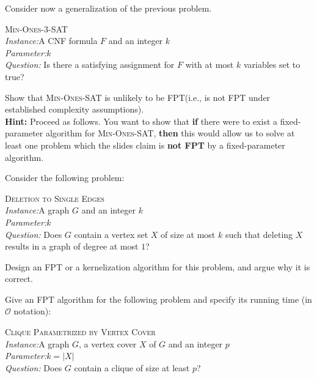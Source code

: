\documentclass{article}
\begin{document}
\begin{exercise}
    Consider now a generalization of the previous problem.
    \begin{mdframed} \textsc{Min-Ones-3-SAT} \\
        \textit{Instance:}A CNF formula $F$ and an integer $k$\\
\textit{Parameter:}$k$\\
\textit{Question:} Is there a satisfying assignment for $F$ with at most $k$ variables set to true?
  \end{mdframed}

  Show that \textsc{Min-Ones-SAT} is unlikely to be FPT(i.e., is not FPT under established complexity assumptions).\\
  \textbf{Hint:} Proceed as follows. You want to show that \textbf{if} there were to exist a fixed-parameter algorithm for \textsc{Min-Ones-SAT}, \textbf{then} this would allow us to solve at least one problem which the slides claim is \textbf{not FPT} by a fixed-parameter algorithm.
\end{exercise}


\begin{exercise}
    Consider the following problem:
    \begin{mdframed} \textsc{Deletion to Single Edges} \\
        \textit{Instance:}A graph $G$ and an integer $k$\\
\textit{Parameter:}$k$\\
\textit{Question:} Does $G$ contain a vertex set $X$ of size at most $k$ such that deleting $X$ results in a graph of degree at most $1$?
  \end{mdframed}
  Design an FPT or a kernelization algorithm for this problem, and argue why it is correct.
\end{exercise}


\begin{exercise}
    Give an FPT algorithm for the following problem and specify its running time (in $\mathcal O$ notation):
    \begin{mdframed} \textsc{Clique Parametrized by Vertex Cover} \\
        \textit{Instance:}A graph $G$, a vertex cover $X$ of $G$ and an integer $p$\\
\textit{Parameter:}$k = |X|$\\
\textit{Question:} Does $G$ contain a clique of size at least $p$?
  \end{mdframed}
\end{exercise}
\end{document}
